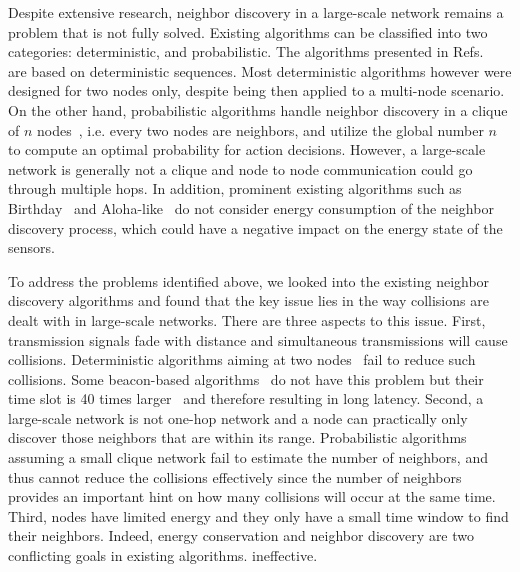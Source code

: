 Despite extensive research, neighbor discovery in a large-scale network
remains a problem that is not fully solved.
Existing algorithms can be classified into two categories: deterministic, and probabilistic.
The algorithms presented in
Refs.~\cite{dutta2008practical, kandhalu2010u, bakht2012searchlight,
sun2014hello, chen2015heterogeneous, qiu2016talk} are %
based on deterministic sequences.
Most deterministic algorithms however were designed for two
nodes only, despite being then applied to a multi-node scenario.
On the other hand,
probabilistic algorithms handle neighbor discovery in a clique of $n$
nodes~\cite{mcglynn2001birthday, vasudevan2009neighbor, you2011aloha,
song2014probabilistic}, i.e. every two nodes are neighbors, and utilize
the global number $n$ to compute an optimal probability for action
decisions. However, a large-scale network is generally not a clique and
node to node communication could go through multiple hops.
In addition, prominent existing
algorithms such as Birthday~\cite{mcglynn2001birthday} and Aloha-like~\cite{vasudevan2009neighbor} 
do not consider energy consumption of the
neighbor discovery process, which could have a negative impact on the
energy state of the sensors.

To address the problems identified above, we looked into the existing
neighbor discovery algorithms and found that the key issue lies in the
way collisions are dealt with in large-scale networks.
There are three aspects to this issue.
First, transmission signals fade with distance and simultaneous
transmissions will cause collisions. %
Deterministic algorithms aiming at two nodes~\cite{kandhalu2010u,
chen2015heterogeneous} fail to reduce such collisions. Some beacon-based
algorithms~\cite{dutta2008practical, bakht2012searchlight, sun2014hello,
qiu2016talk} do not have this problem but their time slot is 40 times
larger~\cite{kandhalu2010u} and therefore resulting in long latency. 
Second, a large-scale network is not one-hop network and a node can
practically only discover those neighbors that are within its range.
Probabilistic algorithms~\cite{vasudevan2009neighbor, you2011aloha, song2014probabilistic}
assuming a small clique network fail to estimate the number of
neighbors, and thus cannot reduce the collisions effectively since the
number of neighbors provides an important hint on how many collisions
will occur at the same time.
Third, nodes have limited energy and they only have a small time window
to find their neighbors. Indeed, energy conservation and
neighbor discovery are two conflicting goals in existing algorithms.
ineffective.

